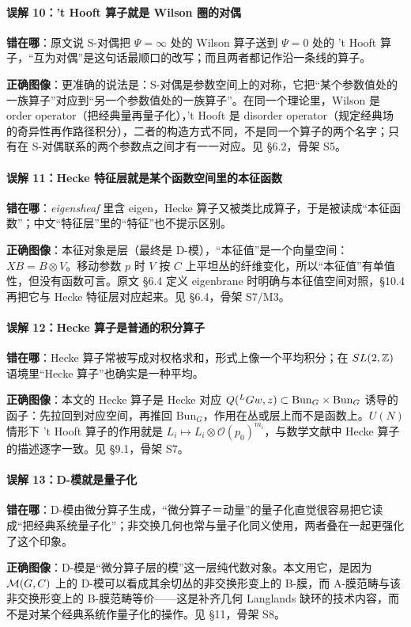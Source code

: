 \paragraph{误解 10：'t Hooft 算子就是 Wilson 圈的对偶}
\mbox{}\par\noindent
\textbf{错在哪}：原文说 S-对偶把 $\Psi=\infty$ 处的 Wilson 算子送到 $\Psi=0$ 处的 't Hooft 算子，“互为对偶”是这句话最顺口的改写；而且两者都记作沿一条线的算子。
\par\noindent
\textbf{正确图像}：更准确的说法是：S-对偶是参数空间上的对称，它把“某个参数值处的一族算子”对应到“另一个参数值处的一族算子”。在同一个理论里，Wilson 是 order operator（把经典量再量子化），'t Hooft 是 disorder operator（规定经典场的奇异性再作路径积分），二者的构造方式不同，不是同一个算子的两个名字；只有在 S-对偶联系的两个参数点之间才有一一对应。见 \S6.2，骨架 S5。

\paragraph{误解 11：Hecke 特征层就是某个函数空间里的本征函数}
\mbox{}\par\noindent
\textbf{错在哪}：\emph{eigensheaf} 里含 eigen，Hecke 算子又被类比成算子，于是被读成“本征函数”；中文“特征层”里的“特征”也不提示区别。
\par\noindent
\textbf{正确图像}：本征对象是层（最终是 D-模），“本征值”是一个向量空间：$XB=B\otimes V$。移动参数 $p$ 时 $V$ 按 $C$ 上平坦丛的纤维变化，所以“本征值”有单值性，但没有函数可言。原文 \S6.4 定义 eigenbrane 时明确与本征值空间对照，\S10.4 再把它与 Hecke 特征层对应起来。见 \S6.4，骨架 S7/M3。

\paragraph{误解 12：Hecke 算子是普通的积分算子}
\mbox{}\par\noindent
\textbf{错在哪}：Hecke 算子常被写成对权格求和，形式上像一个平均积分；在 $SL(2,\mathbb{Z})$ 语境里“Hecke 算子”也确实是一种平均。
\par\noindent
\textbf{正确图像}：本文的 Hecke 算子是 Hecke 对应 $Q({}^{L}G w,z)\subset\mathrm{Bun}_G\times\mathrm{Bun}_G$ 诱导的函子：先拉回到对应空间，再推回 $\mathrm{Bun}_G$，作用在丛或层上而不是函数上。$U(N)$ 情形下 't Hooft 算子的作用就是 $L_i\mapsto L_i\otimes\mathcal{O}(p_0)^{m_i}$，与数学文献中 Hecke 算子的描述逐字一致。见 \S9.1，骨架 S7。

\paragraph{误解 13：D-模就是量子化}
\mbox{}\par\noindent
\textbf{错在哪}：D-模由微分算子生成，“微分算子＝动量”的量子化直觉很容易把它读成“把经典系统量子化”；非交换几何也常与量子化同义使用，两者叠在一起更强化了这个印象。
\par\noindent
\textbf{正确图像}：D-模是“微分算子层的模”这一层纯代数对象。本文用它，是因为 $\mathcal{M}(G,C)$ 上的 D-模可以看成其余切丛的非交换形变上的 B-膜，而 A-膜范畴与该非交换形变上的 B-膜范畴等价——这是补齐几何 Langlands 缺环的技术内容，而不是对某个经典系统作量子化的操作。见 \S11，骨架 S8。

